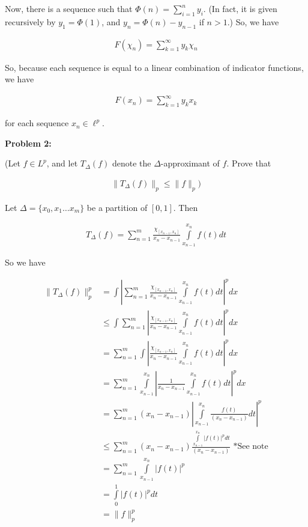 \documentclass[a4paper,12pt]{article}
\newcommand{\shunt}{\vspace{20mm}}
\newcommand{\absval}[1]{\left\lvert #1 \right\rvert}
\newcommand{\norm}[1]{\|#1\|}
\newcommand{\De}{\Delta}
\begin{document}
Now, there is a sequence such that $\Phi(n) = \sum\limits_{i=1}^n y_i$. (In fact, it is given recursively by $y_1 = \Phi(1)$, and $y_n = \Phi(n)-y_{n-1}$ if $n >1$.) So, we have

\begin{align*}
F(\chi_n) = \sum\limits_{k=1}^\infty y_k \chi_n
\end{align*}

So, because each sequence is equal to a linear combination of indicator functions, we have

\begin{align*}
F(x_n) = \sum\limits_{k=1}^\infty y_k x_k
\end{align*}

for each sequence $x_n \in \ell^p$. 


\shunt

{\bf Problem 2:} 

(Let $f \in L^p$, and let $T_\De(f)$ denote the $\De$-approximant of $f$. Prove that

\begin{align*}
\norm{T_\De(f)}_p \leq \norm{f}_p)
\end{align*}

Let $\De = \{x_0,x_1 \ldots x_m\}$ be a partition of $[0,1]$. Then 

\begin{align*}
T_\De(f) = \sum\limits_{n=1}^{m} \frac{\chi_{[x_{n-1},x_n]}}{x_n-x_{n-1}}\int\limits_{x_{n-1}}^{x_n} f(t)dt
\end{align*} 

So we have %

\begin{align*}
\norm{T_\De(f)}_p^p &= \int \absval{\sum\limits_{n=1}^{m} \frac{\chi_{[x_{n-1},x_n]}}{x_n-x_{n-1}}\int\limits_{x_{n-1}}^{x_n} f(t)dt}^pdx\\
&\leq \int \sum\limits_{n=1}^{m} \absval{ \frac{\chi_{[x_{n-1},x_n]}}{x_n-x_{n-1}}\int\limits_{x_{n-1}}^{x_n} f(t)dt}^pdx\\
&= \sum\limits_{n=1}^{m}\int  \absval{ \frac{\chi_{[x_{n-1},x_n]}}{x_n-x_{n-1}}\int\limits_{x_{n-1}}^{x_n} f(t)dt}^pdx\\
&= \sum\limits_{n=1}^{m}\int\limits_{x_{n-1}}^{x_n}  \absval{ \frac{1}{x_n-x_{n-1}}\int\limits_{x_{n-1}}^{x_n} f(t)dt}^pdx\\
&= \sum\limits_{n=1}^{m} (x_n-x_{n-1})\absval{ \int\limits_{x_{n-1}}^{x_n} \frac{f(t)}{(x_n-x_{n-1})}dt}^p\\
&\leq \sum\limits_{n=1}^{m} (x_n-x_{n-1})  \frac{\int\limits_{x_{n-1}}^{x_n}\absval{f(t)}^p dt}{(x_n-x_{n-1})} \text{ *See note}\\
&= \sum\limits_{n=1}^{m} \int\limits_{x_{n-1}}^{x_n}\absval{f(t)}^p \\
&= \int\limits_0^1 \absval{f(t)}^p dt \\
&= \norm{f}_p^p
\end{align*}
\end{document}
